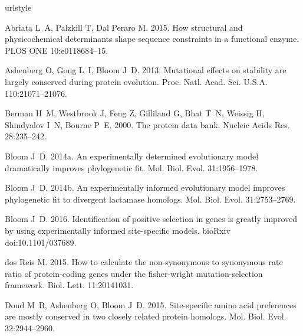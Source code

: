 \documentclass[11pt]{article}
\begin{document}
\begin{thebibliography}{38}
\providecommand{\natexlab}[1]{#1}
\expandafter\ifx\csname urlstyle\endcsname\relax
  \providecommand{\doi}[1]{doi:\discretionary{}{}{}#1}\else
  \providecommand{\doi}{doi:\discretionary{}{}{}\begingroup
  \urlstyle{rm}\Url}\fi

Abriata L~A, Palzkill T, {Dal Peraro} M. 2015.
\newblock How structural and physicochemical determinants shape sequence
  constraints in a functional enzyme.
\newblock PLOS ONE 10:e0118684--15.

Ashenberg O, Gong L~I, Bloom J~D. 2013.
\newblock Mutational effects on stability are largely conserved during protein
  evolution.
\newblock Proc. Natl. Acad. Sci. U.S.A. 110:21071--21076.

Berman H~M, Westbrook J, Feng Z, Gilliland G, Bhat T~N, Weissig H, Shindyalov
  I~N, Bourne P~E. 2000.
\newblock The protein data bank.
\newblock Nucleic Acids Res. 28:235--242.

\bibitem[{Bloom(2014{\natexlab{a}})}]{Bloom2014a}
Bloom J~D. 2014{\natexlab{a}}.
\newblock An experimentally determined evolutionary model dramatically improves
  phylogenetic fit.
\newblock Mol. Biol. Evol. 31:1956--1978.

\bibitem[{Bloom(2014{\natexlab{b}})}]{Bloom2014b}
Bloom J~D. 2014{\natexlab{b}}.
\newblock An experimentally informed evolutionary model improves phylogenetic
  fit to divergent lactamase homologs.
\newblock Mol. Biol. Evol. 31:2753--2769.

Bloom J~D. 2016.
\newblock Identification of positive selection in genes is greatly improved by
  using experimentally informed site-specific models.
\newblock bioRxiv \doi{10.1101/037689}.

{dos Reis} M. 2015.
\newblock How to calculate the non-synonymous to synonymous rate ratio of
  protein-coding genes under the fisher-wright mutation-selection framework.
\newblock Biol. Lett. 11:20141031.

Doud M~B, Ashenberg O, Bloom J~D. 2015.
\newblock Site-specific amino acid preferences are mostly conserved in two
  closely related protein homologs.
\newblock Mol. Biol. Evol. 32:2944--2960.


\end{thebibliography}
\end{document}
